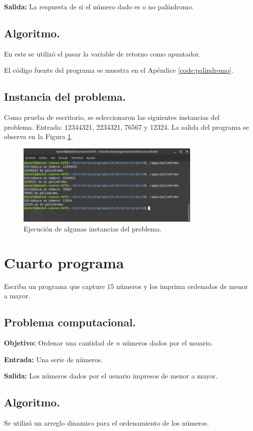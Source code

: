 \documentclass[12pt,letterpaper]{article}
\begin{document}
\textbf{Salida:} La respuesta de si el n\'umero dado es o no pal\'indromo.

\subsection{Algoritmo.}
En este se utiliz\'o el pasar la variable de retorno como apuntador.


El código fuente del programa se muestra en el Apéndice \ref{code:palindromo}.

\subsection{Instancia del problema.}
Como prueba de escritorio, se seleccionaron las siguientes instancias del problema. Entrada: 12344321, 2234321, 76567 y 12324. La salida del programa se observa en la Figura \ref{fig:palindromo}.
\begin{figure}[ht!]
  \centering
  \includegraphics[width=0.8\textwidth]{figures/palindromo}
  \caption{Ejecución de algunas instancias del problema.}
  \label{fig:palindromo}
\end{figure}
\newpage

\section{Cuarto programa}

Escriba un programa que capture 15 n\'umeros y los imprima ordenados de menor a mayor.

\subsection{Problema computacional.}
\textbf{Objetivo:} Ordenar una cantidad de $n$ n\'umeros dados por el usuario.

\textbf{Entrada:} Una serie de n\'umeros.

\textbf{Salida:} Los n\'umeros dados por el usuario impresos de menor a mayor.

\subsection{Algoritmo.}
Se utiliz\'o un arreglo dinamico para el ordenamiento de los n\'umeros.
\end{document}
